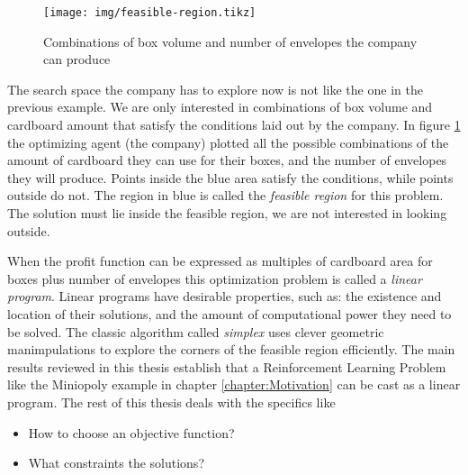 \begin{figure}
   \centering
   \texttt{[image: img/feasible-region.tikz]} 
   \caption{Combinations of box volume and number of envelopes the company can produce}
   \label{fig:feasible-region}
\end{figure}

The search space the company has to explore now is not like the one in the
previous example. We are only interested in combinations of box volume and
cardboard amount that satisfy the conditions laid out by the company. In figure
\ref{fig:feasible-region} the optimizing agent (the company) plotted all the
possible combinations of the amount of cardboard they can use for their boxes,
and the number of envelopes they will produce. Points inside the blue area
satisfy the conditions, while points outside do not. The region in blue is
called the \emph{feasible region} for this problem. The solution must lie inside
the feasible region, we are not interested in looking outside.

When the profit function can be expressed as multiples of cardboard area for
boxes plus number of envelopes this optimization problem is called a
\emph{linear program}. Linear programs have desirable properties, such as: the
existence and location of their solutions, and the amount of computational power
they need to be solved. The classic algorithm called \emph{simplex} uses clever
geometric manimpulations to explore the corners of the feasible region
efficiently. The main results reviewed in this thesis establish that a
Reinforcement Learning Problem like the Miniopoly example in chapter
\ref{chapter:Motivation} can be cast as a linear program. The rest of this
thesis deals with the specifics like
\begin{itemize}
    \item How to choose an objective function?
    \item What constraints the solutions?
\end{itemize}


